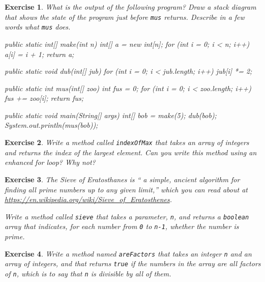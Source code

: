 \documentclass[12pt]{book}
\theoremstyle{exercise}
\newtheorem{exercise}{Exercise}[chapter]
\newcommand{\java}[1]{\verb"#1"}
\newcommand{\java}[1]{\lstinline{#1}} %
\begin{document}
\begin{exercise}
What is the output of the following program?
Draw a stack diagram that shows the state of the program just before \java{mus} returns.
Describe in a few words what \java{mus} does.

\begin{code}
    public static int[] make(int n) {
        int[] a = new int[n];
        for (int i = 0; i < n; i++) {
            a[i] = i + 1;
        }
        return a;
    }
\end{code}

\begin{code}
    public static void dub(int[] jub) {
        for (int i = 0; i < jub.length; i++) {
            jub[i] *= 2;
        }
    }
\end{code}

\begin{code}
    public static int mus(int[] zoo) {
        int fus = 0;
        for (int i = 0; i < zoo.length; i++) {
            fus += zoo[i];
        }
        return fus;
    }
\end{code}

\begin{code}
    public static void main(String[] args) {
        int[] bob = make(5);
        dub(bob);
        System.out.println(mus(bob));
    }
\end{code}
\end{exercise}


\begin{exercise}
Write a method called \java{indexOfMax} that takes an array of integers and returns the index of the largest element.
Can you write this method using an enhanced for loop?  Why not?
\end{exercise}



\begin{exercise}
The Sieve of Eratosthanes is `` a simple, ancient algorithm for finding all prime numbers up to any given limit,'' which you can read about at \url{https://en.wikipedia.org/wiki/Sieve_of_Eratosthenes}.

Write a method called \java{sieve} that takes a parameter, \java{n}, and returns a \java{boolean} array that indicates, for each number from \java{0} to \java{n-1}, whether the number is prime.
\end{exercise}



\begin{exercise}
Write a method named \java{areFactors} that takes an integer \java{n} and an array of integers, and that returns \java{true} if the numbers in the array are all factors of \java{n}, which is to say that \java{n} is divisible by all of them.
\end{exercise}
\end{document}
